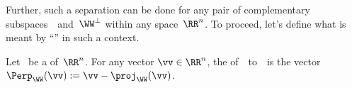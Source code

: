 Further, such a separation can be done for any pair of complementary subspaces~\WW\ and~\(\WW^\perp\) within any space~\(\RR^n\).
To proceed, let's define what is meant by ``\Perp'' in such a context.


\begin{definition} \label{def:perpn}
Let \WW\ be a  of~\(\RR^n\).
For any vector \(\vv\in\RR^n\), the  of~\vv\  to~\WW\ is the vector
\(\Perp_\WW(\vv):=\vv-\proj_{\WW}(\vv)\).
\end{definition}




